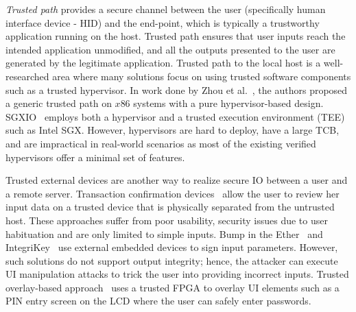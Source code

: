 \emph{Trusted path} provides a secure channel between the user (specifically human interface device - HID) and the end-point, which is typically a trustworthy application running on the host. Trusted path ensures that user inputs reach the intended application unmodified, and all the outputs presented to the user are generated by the legitimate application. Trusted path to the local host is a well-researched area where many solutions focus on using trusted software components such as a trusted hypervisor. In work done by Zhou et al.~\cite{zhou2012building}, the authors proposed a generic trusted path on $x86$ systems with a pure hypervisor-based design. SGXIO~\cite{weiser2017sgxio} employs both a hypervisor and a trusted execution environment (TEE) such as Intel SGX. However, hypervisors are hard to deploy, have a large TCB, and are impractical in real-world scenarios as most of the existing verified hypervisors offer a minimal set of features. 


Trusted external devices are another way to realize secure IO between a user and a remote server. Transaction confirmation devices~\cite{filyanov2011uni,weigold2011secure} allow the user to review her input data on a trusted device that is physically separated from the untrusted host. These approaches suffer from poor usability, security issues due to user habituation and are only limited to simple inputs. Bump in the Ether~\cite{McCPerRei2006} and IntegriKey~\cite{IntegriKey} use external embedded devices to sign input parameters. However, such solutions do not support output integrity; hence, the attacker can execute UI manipulation attacks to trick the user into providing incorrect inputs. Trusted overlay-based approach~\cite{brandon2017trusted} uses a trusted FPGA to overlay UI elements such as a PIN entry screen on the LCD where the user can safely enter passwords.


